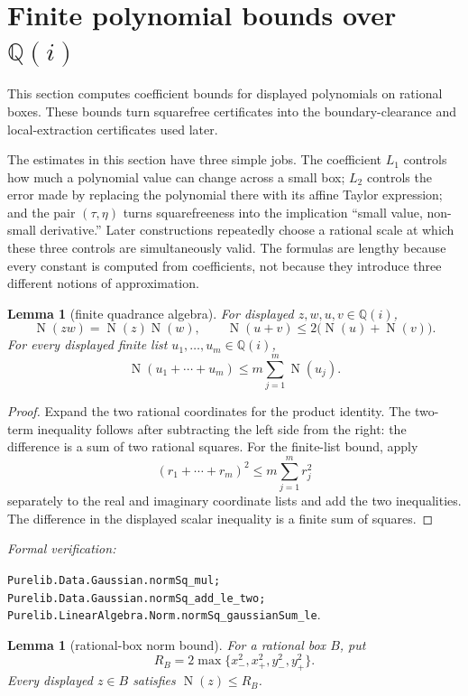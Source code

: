 \documentclass[11pt]{article}
\newtheorem{lemma}[theorem]{Lemma}
\newcommand{\Qi}{\mathbb{Q}(i)}
\newcommand{\Norm}[1]{\operatorname{N}\!\left(#1\right)}
\newcommand{\leanref}[1]{\par\smallskip\noindent
  \emph{Formal verification:}\par\nobreak
  {\raggedright\nolinkurl{#1}.\par}}
\begin{document}
\section{Finite polynomial bounds over \texorpdfstring{$\Qi$}{Q(i)}}
\label{sec:finite-bounds}

This section computes coefficient bounds for displayed polynomials on
rational boxes.  These bounds turn squarefree certificates into the
boundary-clearance and local-extraction certificates used later.

The estimates in this section have three simple jobs.  The coefficient
$L_1$ controls how much a polynomial value can change across a small box;
$L_2$ controls the error made by replacing the polynomial there with its
affine Taylor expression; and the pair $(\tau,\eta)$ turns squarefreeness
into the implication ``small value, non-small derivative.''  Later
constructions repeatedly choose a rational scale at which these three
controls are simultaneously valid.  The formulas are lengthy because every
constant is computed from coefficients, not because they introduce three
different notions of approximation.

\begin{lemma}[finite quadrance algebra]
\label{lem:finite-quadrance-algebra}
For displayed $z,w,u,v\in\Qi$,
\[
 \Norm{zw}=\Norm z\Norm w,
 \qquad
 \Norm{u+v}\le 2\bigl(\Norm u+\Norm v\bigr).
\]
For every displayed finite list $u_1,\dots,u_m\in\Qi$,
\begin{equation}
\label{eq:finite-sum}
 \Norm{u_1+\cdots+u_m}\le m\sum_{j=1}^{m}\Norm{u_j}.
\end{equation}
\end{lemma}

\begin{proof}
Expand the two rational coordinates for the product identity.  The
two-term inequality follows after subtracting the left side from the right:
the difference is a sum of two rational squares.  For the finite-list bound,
apply
\[
       (r_1+\cdots+r_m)^2\le m\sum_{j=1}^{m}r_j^2
\]
separately to the real and imaginary coordinate lists and add the two
inequalities.  The difference in the displayed scalar inequality is a finite
sum of squares.
\end{proof}

\leanref{Purelib.Data.Gaussian.normSq_mul;
Purelib.Data.Gaussian.normSq_add_le_two;
Purelib.LinearAlgebra.Norm.normSq_gaussianSum_le}

\begin{lemma}[rational-box norm bound]
\label{lem:box-norm-bound}
For a rational box $B$, put
\[
  R_B=2\max\{x_-^2,x_+^2,y_-^2,y_+^2\}.
\]
Every displayed $z\in B$ satisfies $\Norm z\le R_B$.
\end{lemma}
\end{document}
